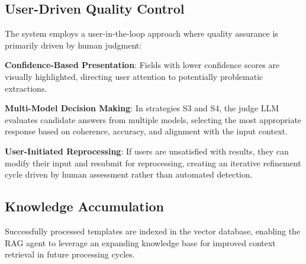 \subsection*{User-Driven Quality Control}

The system employs a user-in-the-loop approach where quality assurance is primarily driven by human judgment:

\textbf{Confidence-Based Presentation}: Fields with lower confidence scores are visually highlighted, directing user attention to potentially problematic extractions.

\textbf{Multi-Model Decision Making}: In strategies S3 and S4, the judge LLM evaluates candidate answers from multiple models, selecting the most appropriate response based on coherence, accuracy, and alignment with the input context.

\textbf{User-Initiated Reprocessing}: If users are unsatisfied with results, they can modify their input and resubmit for reprocessing, creating an iterative refinement cycle driven by human assessment rather than automated detection.

\subsection*{Knowledge Accumulation}

Successfully processed templates are indexed in the vector database, enabling the RAG agent to leverage an expanding knowledge base for improved context retrieval in future processing cycles.